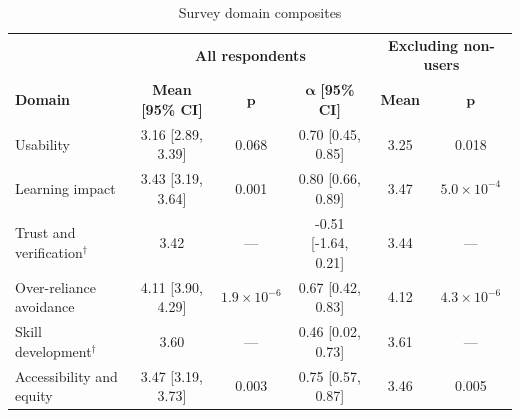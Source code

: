 \begin{table}[!htbp]
\centering
\caption{Survey domain composites}
\label{tab:sup_survey}
\small
\begin{tabular}{lccccc}
\toprule
& \multicolumn{3}{c}{\textbf{All respondents}} & \multicolumn{2}{c}{\textbf{Excluding non-users}} \\
\textbf{Domain} & \textbf{Mean [95\% CI]} & $\boldsymbol{p}$ & $\boldsymbol{\alpha}$ \textbf{[95\% CI]} & \textbf{Mean} & $\boldsymbol{p}$ \\
\midrule
Usability & 3.16 [2.89, 3.39] & 0.068 & 0.70 [0.45, 0.85] & 3.25 & 0.018 \\
Learning impact & 3.43 [3.19, 3.64] & 0.001 & 0.80 [0.66, 0.89] & 3.47 & $5.0{\times}10^{-4}$ \\
Trust and verification$^\dagger$ & 3.42 & --- & -0.51 [-1.64, 0.21] & 3.44 & --- \\
Over-reliance avoidance & 4.11 [3.90, 4.29] & $1.9{\times}10^{-6}$ & 0.67 [0.42, 0.83] & 4.12 & $4.3{\times}10^{-6}$ \\
Skill development$^\dagger$ & 3.60 & --- & 0.46 [0.02, 0.73] & 3.61 & --- \\
Accessibility and equity & 3.47 [3.19, 3.73] & 0.003 & 0.75 [0.57, 0.87] & 3.46 & 0.005 \\
\bottomrule
\end{tabular}
\end{table}
